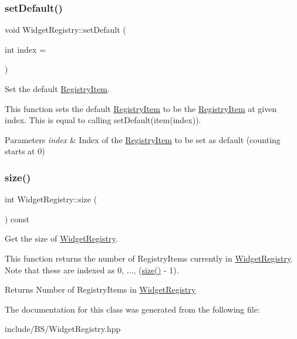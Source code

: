 \subsubsection{\texorpdfstring{set\+Default()}{setDefault()}\hspace{0.1cm}{\footnotesize\ttfamily [2/2]}}
{\footnotesize\ttfamily void Widget\+Registry\+::set\+Default (\begin{DoxyParamCaption}\item[{int}]{index = {} }\end{DoxyParamCaption})}



Set the default \hyperlink{class_registry_item}{Registry\+Item}. 

This function sets the default \hyperlink{class_registry_item}{Registry\+Item} to be the \hyperlink{class_registry_item}{Registry\+Item} at given index. This is equal to calling set\+Default(item(index)). 
\begin{DoxyParams}{Parameters}
{\em index} & Index of the \hyperlink{class_registry_item}{Registry\+Item} to be set as default (counting starts at 0) \\
\hline
\end{DoxyParams}
\hypertarget{class_widget_registry_a13ca89bca85a4680f79e56d29263d219}{}\label{class_widget_registry_a13ca89bca85a4680f79e56d29263d219} 
\subsubsection{\texorpdfstring{size()}{size()}}
{\footnotesize\ttfamily int Widget\+Registry\+::size (\begin{DoxyParamCaption}{ }\end{DoxyParamCaption}) const}



Get the size of \hyperlink{class_widget_registry}{Widget\+Registry}. 

This function returns the number of Registry\+Items currently in \hyperlink{class_widget_registry}{Widget\+Registry}. Note that these are indexed as 0, ..., (\hyperlink{class_widget_registry_a13ca89bca85a4680f79e56d29263d219}{size()} -\/ 1). \begin{DoxyReturn}{Returns}
Number of Registry\+Items in \hyperlink{class_widget_registry}{Widget\+Registry} 
\end{DoxyReturn}


The documentation for this class was generated from the following file\+:\begin{DoxyCompactItemize}
\item 
include/\+B\+S/Widget\+Registry.\+hpp\end{DoxyCompactItemize}
